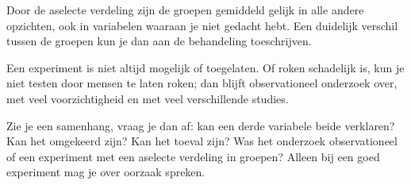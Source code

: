Door de aselecte verdeling zijn de groepen gemiddeld gelijk in alle andere opzichten, ook in variabelen waaraan je niet gedacht hebt. Een duidelijk verschil tussen de groepen kun je dan aan de behandeling toeschrijven.


Een experiment is niet altijd mogelijk of toegelaten. Of roken schadelijk is, kun je niet testen door mensen te laten roken; dan blijft observationeel onderzoek over, met veel voorzichtigheid en met veel verschillende studies.

\begin{werkwijze}
Zie je een samenhang, vraag je dan af: kan een derde variabele beide verklaren? Kan het omgekeerd zijn? Kan het toeval zijn? Was het onderzoek observationeel of een experiment met een aselecte verdeling in groepen? Alleen bij een goed experiment mag je over oorzaak spreken.
\end{werkwijze}

\begin{oefeningen}
\end{oefeningen}

\opdrachtenkop

